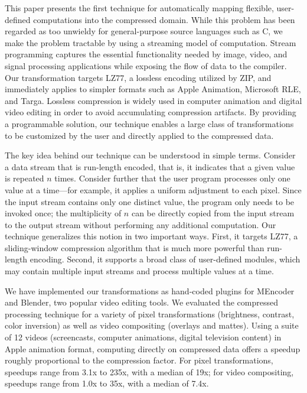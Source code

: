 This paper presents the first technique for automatically mapping
flexible, user-defined computations into the compressed domain.  While
this problem has been regarded as too unwieldy for general-purpose
source languages such as C, we make the problem tractable by using a
streaming model of computation.  Stream programming captures the
essential functionality needed by image, video, and signal processing
applications while exposing the flow of data to the compiler.  Our
transformation targets LZ77, a lossless encoding utilized by ZIP, and
immediately applies to simpler formats such as Apple Animation,
Microsoft RLE, and Targa.  Lossless compression is widely used in
computer animation and digital video editing in order to avoid
accumulating compression artifacts.  By providing a programmable
solution, our technique enables a large class of transformations to be
customized by the user and directly applied to the compressed data.

The key idea behind our technique can be understood in simple terms.
Consider a data stream that is run-length encoded, that is, it
indicates that a given value is repeated $n$ times.  Consider further
that the user program processes only one value at a time---for
example, it applies a uniform adjustment to each pixel.  Since the
input stream contains only one distinct value, the program only needs
to be invoked once; the multiplicity of $n$ can be directly copied
from the input stream to the output stream without performing any
additional computation.  Our technique generalizes this notion in two
important ways.  First, it targets LZ77, a sliding-window compression
algorithm that is much more powerful than run-length encoding.
Second, it supports a broad class of user-defined modules, which may
contain multiple input streams and process multiple values at a time.

We have implemented our transformations as hand-coded plugins for
MEncoder and Blender, two popular video editing tools.  We evaluated
the compressed processing technique for a variety of pixel
transformations (brightness, contrast, color inversion) as well as
video compositing (overlays and mattes).  Using a suite of 12 videos
(screencasts, computer animations, digital television content) in
Apple animation format, computing directly on compressed data offers a
speedup roughly proportional to the compression factor.  For pixel
transformations, speedups range from 3.1x to 235x, with a median of
19x; for video compositing, speedups range from 1.0x to 35x, with a
median of 7.4x.

